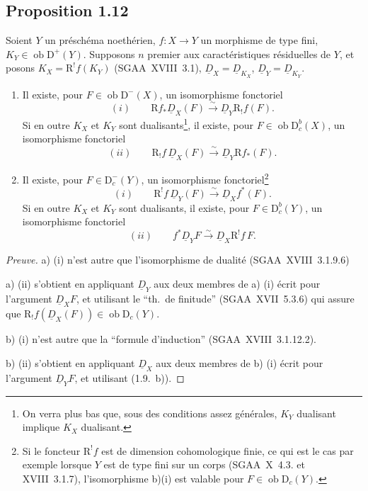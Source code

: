 \documentclass[11pt]{article}
\newcommand{\R}{\mathrm{R}}\newcommand{\RHomCore}{\mathrm{RHom}}
\newcommand{\D}{\mathrm{D}}
\newcommand{\ob}{\operatorname{ob}}
\providecommand{\ob}{\operatorname{ob}}
\providecommand{\R}{\mathrm R}
\begin{document}
\subsection*{Proposition 1.12}
Soient $Y$ un préschéma noethérien, $f : X \to Y$ un morphisme de type fini, $K_Y \in \ob \D^{+}(Y)$. Supposons $n$ premier aux caractéristiques résiduelles de $Y$, et posons $K_X = \R^{!}f(K_Y)$ (SGAA~XVIII~3.1), $\underline{D}_X = \underline{D}_{K_X}$, $\underline{D}_Y = \underline{D}_{K_Y}$.
\begin{enumerate}
\item[a)] Il existe, pour $F \in \ob \D^{-}(X)$, un isomorphisme fonctoriel
\[
(i) \qquad \R f_{*} \underline{D}_X(F) \xrightarrow{\sim} \underline{D}_Y \R_{!}f(F).
\]
Si en outre $K_X$ et $K_Y$ sont dualisants\footnote{On verra plus bas que, sous des conditions assez générales, $K_Y$ dualisant implique $K_X$ dualisant.}, il existe, pour $F \in \ob \D_c^{b}(X)$, un isomorphisme fonctoriel
\[
(ii) \qquad \R_{!}f \, \underline{D}_X(F) \xrightarrow{\sim} \underline{D}_Y \R f_{*}(F).
\]
\item[b)] Il existe, pour $F \in \D_c^{-}(Y)$, un isomorphisme fonctoriel\footnote{Si le foncteur $\R^{!}f$ est de dimension cohomologique finie, ce qui est le cas par exemple lorsque $Y$ est de type fini sur un corps (SGAA~X~4.3. et XVIII~3.1.7), l'isomorphisme b)(i) est valable pour $F \in \ob \D_c(Y)$.}
\[
(i) \qquad \R^{!}f \, \underline{D}_Y(F) \xrightarrow{\sim} \underline{D}_X f^{*}(F).
\]
Si en outre $K_X$ et $K_Y$ sont dualisants\footnotemark[3], il existe, pour $F \in \D_c^{b}(Y)$, un isomorphisme fonctoriel
\[
(ii) \qquad f^{*} \underline{D}_Y F \xrightarrow{\sim} \underline{D}_X \R^{!}f \, F.
\]
\end{enumerate}

\begin{proof}[Preuve]
a) (i) n'est autre que l'isomorphisme de dualité (SGAA~XVIII~3.1.9.6)

a) (ii) s'obtient en appliquant $\underline{D}_Y$ aux deux membres de a) (i) écrit pour l'argument $\underline{D}_X F$, et utilisant le ``th.~de finitude'' (SGAA~XVII~5.3.6) qui assure que $\R_{!}f(\underline{D}_X(F)) \in \ob \D_c(Y)$.

b) (i) n'est autre que la ``formule d'induction'' (SGAA~XVIII~3.1.12.2).

b) (ii) s'obtient en appliquant $\underline{D}_X$ aux deux membres de b) (i) écrit pour l'argument $\underline{D}_Y F$, et utilisant (1.9.~b)).
\end{proof}
\end{document}
